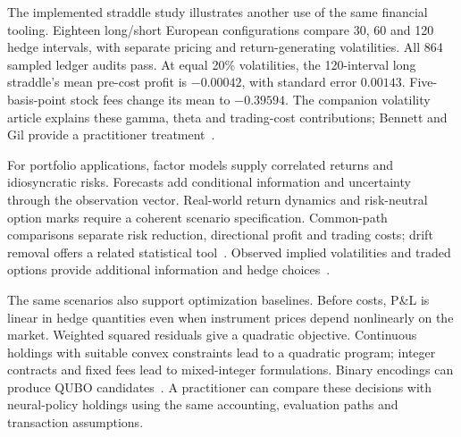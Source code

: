 \documentclass[8pt]{strategynet-journal}
\begin{document}
\begin{SNcolumns}
The implemented straddle study illustrates another use of the same financial
tooling. Eighteen long/short European configurations compare 30, 60 and 120
hedge intervals, with separate pricing and return-generating volatilities.
All 864 sampled ledger audits pass. At equal 20\% volatilities, the
120-interval long straddle's mean pre-cost profit is $-0.00042$, with standard
error $0.00143$. Five-basis-point stock fees change its mean to $-0.39594$.
The companion volatility article explains these gamma, theta and trading-cost
contributions; Bennett and Gil provide a practitioner treatment~\cite{primer}.

For portfolio applications, factor models supply correlated returns and
idiosyncratic risks. Forecasts add conditional information and uncertainty
through the observation vector. Real-world return dynamics and risk-neutral
option marks require a coherent scenario specification. Common-path
comparisons separate risk reduction, directional profit and trading costs;
drift removal offers a related statistical tool~\cite{drift}. Observed implied
volatilities and traded options provide additional information and hedge
choices~\cite{ivhedging}.

The same scenarios also support optimization baselines. Before costs, P\&L
is linear in hedge quantities even when instrument prices depend nonlinearly
on the market. Weighted squared residuals give a quadratic objective.
Continuous holdings with suitable convex constraints lead to a quadratic
program; integer contracts and fixed fees lead to mixed-integer formulations.
Binary encodings can produce QUBO candidates~\cite{mosek,qubo}. A practitioner
can compare these decisions with neural-policy holdings using the same
accounting, evaluation paths and transaction assumptions.

\end{SNcolumns}
\clearpage
\end{document}
